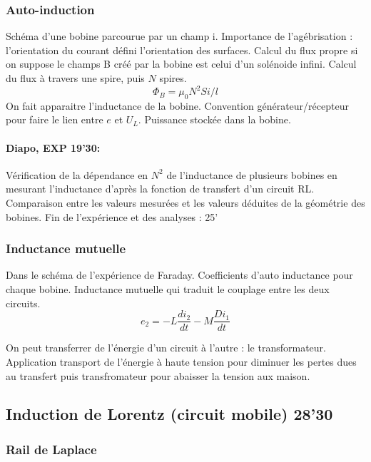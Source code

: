 \subsubsection{Auto-induction}

Schéma d'une bobine parcourue par un champ i.
Importance de l'agébrisation : l'orientation du courant défini l'orientation des surfaces.
Calcul du flux propre si on suppose le champs B créé par la bobine est celui d'un solénoide infini.
Calcul du flux à travers une spire, puis $N$ spires.
\begin{equation}
\Phi_B = \mu_0 N^2 S i /l
\end{equation}
On fait apparaitre l'inductance de la bobine.
Convention générateur/récepteur pour faire le lien entre $e$ et $U_L$.
Puissance stockée dans la bobine.

\paragraph{Diapo, EXP 19'30: } Vérification de la dépendance en $N^2$ de l'inductance de plusieurs bobines en mesurant l'inductance d'après la fonction de transfert d'un circuit RL.
Comparaison entre les valeurs mesurées et les valeurs déduites de la géométrie des bobines.
Fin de l'expérience et des analyses : 25'

\subsubsection{Inductance mutuelle}

Dans le schéma de l'expérience de Faraday.
Coefficients d'auto inductance pour chaque bobine.
Inductance mutuelle qui traduit le couplage entre les deux circuits.
\begin{equation}
e_2 = -L\frac{di_2}{dt} - M\frac{Di_1}{dt}
\end{equation}

On peut transferrer de l'énergie d'un circuit à l'autre : le transformateur.
Application transport de l'énergie à haute tension pour diminuer les pertes dues au transfert puis transfromateur pour abaisser la tension aux maison.

\subsection{Induction de Lorentz (circuit mobile) 28'30}

\subsubsection{Rail de Laplace}

